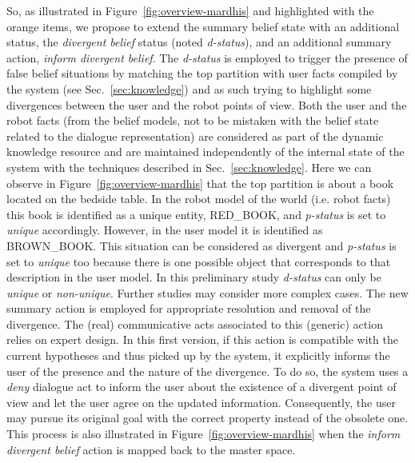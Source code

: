 \documentclass[a4paper,11pt,twoside]{StyleThese}
\begin{document}
So, as illustrated in Figure~\ref{fig:overview-mardhis} and highlighted with the orange items, we propose to extend the summary belief state with an additional status, the
\textit{divergent belief} status (noted \textit{d-status}), and an additional summary action, \textit{inform divergent belief}.
The \textit{d-status} is employed to trigger the presence of false belief situations by matching the top partition with user facts compiled by the system (see Sec.~\ref{sec:knowledge}) and as such trying to highlight some divergences between the user and the robot points of view. 
Both the user and the robot facts (from the belief models, not to be mistaken with the belief state related to the dialogue representation) are considered as part of the dynamic knowledge resource and are maintained independently of the internal state of the system with the techniques described in Sec.~\ref{sec:knowledge}.
Here we can observe in Figure~\ref{fig:overview-mardhis} that the top partition is about a book located on the bedside table. In the robot model of the world (i.e. robot facts) this book is identified as a unique entity, RED\_BOOK, and \textit{p-status} is set to \textit{unique} accordingly. However, in the user model it is identified as BROWN\_BOOK. This situation can be considered as divergent and \textit{p-status} is set to \textit{unique} too because there is one possible object that corresponds to that description in the user model. 
In this preliminary study \textit{d-status} can only be \textit{unique} or \textit{non-unique}. Further studies may consider more complex cases.
%
The new summary action is employed for appropriate resolution and removal of the divergence.
The (real) communicative acts associated to this (generic) action relies on expert design. In this first version, if this action is compatible with the current hypotheses and thus picked up by the system, it explicitly informs the user of the presence and the nature of the divergence. To do so, the system uses a \textit{deny} dialogue act to inform the user about the existence of a divergent point of view and let the user agree on the updated information. 
Consequently, the user may pursue its original goal with the correct property instead of the obsolete one. This process is also illustrated in Figure~\ref{fig:overview-mardhis} when the \textit{inform divergent belief} action is mapped back to the master space.
\end{document}
